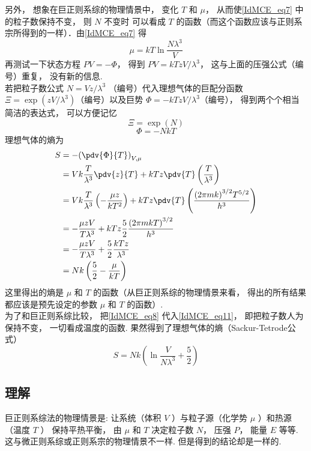 另外， 想象在巨正则系综的物理情景中， 变化 $T$ 和 $\mu $，  从而使\autoref{IdMCE_eq7} 中的粒子数保持不变， 则 $N$ 不变时 可以看成 $T$ 的函数（而这个函数应该与正则系宗所得到的一样）．由\autoref{IdMCE_eq7} 得
\begin{equation}\label{IdMCE_eq8}
\mu  = kT\ln \frac{N{\lambda ^3}}{V}
\end{equation}
再测试一下状态方程 $PV =  - \Phi $，  得到 $PV = kT{{zV}}/{{{\lambda ^3}}}$，  这与上面的压强公式（编号）重复， 没有新的信息.\\
若把粒子数公式 $N = {{Vz}}/{{{\lambda ^3}}}$ （编号）代入理想气体的巨配分函数 $\Xi  = \exp \left( {{{zV}}/{{{\lambda ^3}}}} \right)$（编号）以及巨势 $\Phi  =  - kT{{zV}}/{{{\lambda ^3}}}$（编号）， 得到两个个相当简洁的表达式， 可以方便记忆
\begin{equation}\label{IdMCE_eq9}
\Xi  = \exp \left( N \right)
\end{equation}
\begin{equation}\label{IdMCE_eq10}
\Phi  =  - NkT
\end{equation}
理想气体的熵为
\begin{equation}\label{IdMCE_eq11}
\begin{aligned}
S &=  - {\left( {\pdv{\Phi}{T}} \right)_{V,\mu }} \\
& = Vk\frac{T}{\lambda ^3}\pdv{z}{T} + kTz\pdv{T} \left( {\frac{T}{\lambda ^3}} \right) \\
& = Vk\frac{T}{\lambda ^3}\left( { - \frac{\mu z}{k{T^2}}} \right) + kTz\pdv{T}\left( {\frac{{{(2\pi mk)}^{3/2}}{T^{5/2}}}{h^3}} \right)\\
& =  - \frac{\mu zV}{T{\lambda ^3}} + kTz\frac{5}{2}\frac{{(2\pi mkT)}^{3/2}}{h^3} \\
& =  - \frac{\mu zV}{T{\lambda ^3}} + \frac{5}{2}\frac{kTz}{\lambda ^3} \\
& = Nk\left( {\frac{5}{2} - \frac{\mu }{kT}} \right){\kern 1pt} {\kern 1pt} {\kern 1pt} {\kern 1pt} {\kern 1pt} {\kern 1pt} {\kern 1pt}
\end{aligned}
\end{equation}
这里得出的熵是 $\mu $ 和 $T$ 的函数（从巨正则系综的物理情景来看， 得出的所有结果都应该是预先设定的参数 $\mu $ 和 $T$ 的函数）.\\
为了和巨正则系综比较， 把\autoref{IdMCE_eq8} 代入\autoref{IdMCE_eq11}，  即把粒子数人为保持不变， 一切看成温度的函数. 果然得到了理想气体的熵（Sackur-Tetrode公式）
\begin{equation}\label{IdMCE_eq12}
S = Nk\left( {\ln \frac{V}{N{\lambda ^3}} + \frac{5}{2}} \right)
\end{equation}

\subsection{理解}

巨正则系综法的物理情景是: 让系统（体积 $V$ ）与粒子源（化学势 $\mu $ ）和热源（温度 $T$ ） 保持平热平衡， 由 $\mu $ 和 $T$ 决定粒子数 $N$，  压强 $P$，  能量 $E$ 等等. 这与微正则系综或正则系宗的物理情景不一样. 但是得到的结论却是一样的.

